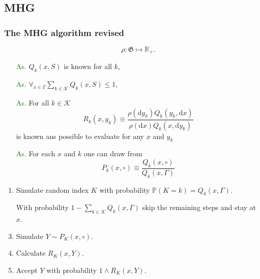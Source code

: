		\subsection{MHG }

\begin{frame}
		\frametitle{ The MHG algorithm revised}

	\begin{itemize}
		\item[] $$\rho: \mathfrak{G} \mapsto \mathbb{R}_{+}.$$  
	\end{itemize}

	\begin{itemize}
	\item[\textcolor{green}{As.}] $Q_k (x,S)$ is known for all $k$,
	\item[\textcolor{green}{As.}] $\forall_{x \in \Gamma} \underset{ k \in \mathcal{K}}{\sum} Q_k (x,S) \leq 1$,
	\item[\textcolor{green}{As.}] For all $k \in \mathcal{K}$ $$R_k (x,y_k) \equiv \frac{\rho(\mathrm{d } y_k)Q_k (y_k, \mathrm{d }x)}{\rho(\mathrm{d } x)Q_k (x, \mathrm{d }y_k)}$$ is known ans possible to evaluate for any $x$ and $y_k$ 
	\item[\textcolor{green}{As.}] For each $x$ and $k$ one can draw from 
		$$P_k(x, \circ) \equiv \frac{Q_k (x, \circ)}{Q_k (x, \Gamma)}$$
\end{itemize}

\end{frame}

\begin{frame}
	\begin{enumerate}
		\item Simulate random index $K$ with probability $\mathbb{P}( K = k ) = Q_k (x,\Gamma)$.
		\item[] With probability $1-\underset{k \in \mathcal{K}}{\sum} Q_k (x,\Gamma)$ skip the remaining steps and stay at $x$.
		\item Simulate $Y \sim P_K (x, \circ)$.
		\item Calculate $R_K (x,Y)$.
		\item Accept $Y$ with probability $1\wedge R_K (x,Y)$.
	\end{enumerate}
\end{frame}

